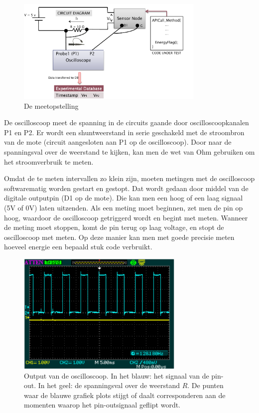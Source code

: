 \documentclass[11pt]{article}
\begin{document}
\begin{figure}[h]
\centering
\includegraphics[width=9cm]{meetopstelling}
\caption{De meetopstelling }
\label{fig:meetopstelling}
\end{figure}

De oscilloscoop meet de spanning in de circuits gaande door oscilloscoopkanalen
P1 en P2. Er wordt een shuntweerstand in serie geschakeld met de stroombron van
de mote (circuit aangesloten aan P1 op de oscilloscoop). Door naar de
spanningsval over de weerstand te kijken, kan men de wet van Ohm gebruiken om
het stroomverbruik te meten.

Omdat de te meten intervallen zo klein zijn, moeten metingen met de oscilloscoop
softwarematig worden gestart en gestopt. Dat wordt gedaan door middel van de
digitale outputpin (D1 op de mote). Die kan men een hoog of een laag signaal (5V
of 0V) laten uitzenden. Als een meting moet beginnen, zet men de pin op hoog,
waardoor de oscilloscoop getriggerd wordt en begint met meten. Wanneer de meting
moet stoppen, komt de pin terug op laag voltage, en stopt de oscilloscoop met meten. Op
deze manier kan men met goede precisie meten hoeveel energie een bepaald stuk
code verbruikt.

\begin{figure}[h]
\centering
\includegraphics[width=8cm]{osc}
\caption{Output van de oscilloscoop. In het blauw: het signaal van de pin-out.
In het geel: de spanningsval over de weerstand $R$. De punten waar de blauwe
grafiek plots stijgt of daalt corresponderen aan de momenten waarop het
pin-outsignaal geflipt wordt.}
\label{fig:osc_werking}
\end{figure}
\end{document}
